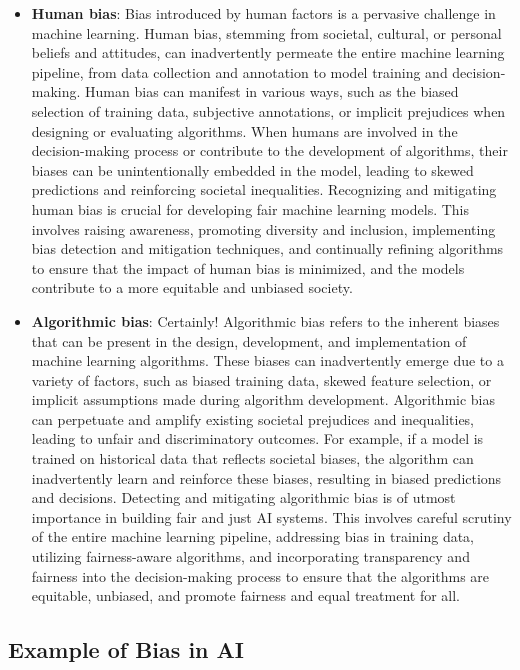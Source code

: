 \documentclass[12pt,a4paper,openright,twoside]{book}
\begin{document}
\begin{itemize}
    \item \textbf{Human bias}: Bias introduced by human factors is a pervasive challenge in machine learning. Human bias, stemming from societal, cultural, or personal beliefs and attitudes, can inadvertently permeate the entire machine learning pipeline, from data collection and annotation to model training and decision-making. Human bias can manifest in various ways, such as the biased selection of training data, subjective annotations, or implicit prejudices when designing or evaluating algorithms. When humans are involved in the decision-making process or contribute to the development of algorithms, their biases can be unintentionally embedded in the model, leading to skewed predictions and reinforcing societal inequalities. Recognizing and mitigating human bias is crucial for developing fair machine learning models. This involves raising awareness, promoting diversity and inclusion, implementing bias detection and mitigation techniques, and continually refining algorithms to ensure that the impact of human bias is minimized, and the models contribute to a more equitable and unbiased society. \cite{https://doi.org/10.1002/widm.1356}
    \item \textbf{Algorithmic bias}: Certainly! Algorithmic bias refers to the inherent biases that can be present in the design, development, and implementation of machine learning algorithms. These biases can inadvertently emerge due to a variety of factors, such as biased training data, skewed feature selection, or implicit assumptions made during algorithm development. Algorithmic bias can perpetuate and amplify existing societal prejudices and inequalities, leading to unfair and discriminatory outcomes. For example, if a model is trained on historical data that reflects societal biases, the algorithm can inadvertently learn and reinforce these biases, resulting in biased predictions and decisions. Detecting and mitigating algorithmic bias is of utmost importance in building fair and just AI systems. This involves careful scrutiny of the entire machine learning pipeline, addressing bias in training data, utilizing fairness-aware algorithms, and incorporating transparency and fairness into the decision-making process to ensure that the algorithms are equitable, unbiased, and promote fairness and equal treatment for all. \cite{10.1145/2983270}
\end{itemize}

\subsection{Example of Bias in AI}
\end{document}
